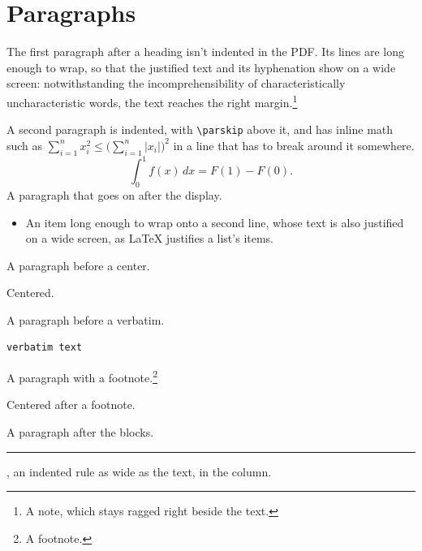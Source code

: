 \documentclass[11pt]{article}
\begin{document}
\tableofcontents
\section{Paragraphs}
The first paragraph after a heading isn't indented in the PDF. Its lines are
long enough to wrap, so that the justified text and its hyphenation show on a
wide screen: notwithstanding the incomprehensibility of characteristically
uncharacteristic words, the text reaches the right margin.\footnote{A note,
which stays ragged right beside the text.}

A second paragraph is indented, with \verb|\parskip| above it, and has inline math
such as $\sum_{i=1}^n x_i^2 \le \bigl(\sum_{i=1}^n |x_i|\bigr)^2$ in a line
that has to break around it somewhere.
\[ \int_0^1 f(x)\,dx = F(1) - F(0). \]
A paragraph that goes on after the display.
\begin{itemize}
\item An item long enough to wrap onto a second line, whose text is also
  justified on a wide screen, as LaTeX justifies a list's items.
\end{itemize}
A paragraph before a center.
\begin{center}
    Centered.
\end{center}
A paragraph before a verbatim.
\begin{verbatim}
verbatim text
\end{verbatim}
A paragraph with a footnote.\footnote{A footnote.}
\begin{center}
    Centered after a footnote.
\end{center}
A paragraph after the blocks.

\rule{\textwidth}{0.4pt}, an indented rule as wide as the text, in the column.
\end{document}
